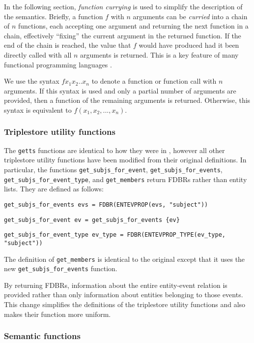 \documentclass[../main.tex]{subfiles}
\begin{document}
In the following section, {\em function currying} \cite{currying} is used to simplify the description of the semantics.
Briefly, a function $f$ with $n$ arguments can be {\em curried} into a chain of $n$ functions, each accepting one argument and returning the next function
in a chain, effectively ``fixing'' the current argument in the returned function.  If the end of the chain is reached, the value that $f$
would have produced had it been directly called with all $n$ arguments is returned.  This is a key feature of many functional programming languages \cite{haskell}.

We use the syntax $f x_1 x_2 .. x_n$ to denote a function or function call with $n$ arguments.  If this syntax is used
and only a partial number of arguments are provided, then a function of the remaining arguments is returned.  Otherwise,
this syntax is equivalent to $f(x_1, x_2, ..., x_n)$.

\subsubsection{Triplestore utility functions}

The \texttt{getts} functions are identical to how they were in \cite{frost2013event}, however
all other triplestore utility functions have been modified from their original definitions.
In particular, the functions \texttt{get\_subjs\_for\_event}, \texttt{get\_subjs\_for\_events},
\texttt{get\_subjs\_for\_event\_type}, and \texttt{get\_members} return FDBRs rather than entity lists.  They are defined as follows:

\texttt{get\_subjs\_for\_events evs = FDBR(ENTEVPROP(evs, "subject"))}

\texttt{get\_subjs\_for\_event ev = get\_subjs\_for\_events \{ev\}}

\texttt{get\_subjs\_for\_event\_type ev\_type = FDBR(ENTEVPROP\_TYPE(ev\_type, "subject"))}

The definition of \texttt{get\_members} is identical to the original except that it uses the new \texttt{get\_subjs\_for\_events} function.

By returning FDBRs, information about the entire entity-event relation is provided rather than only information about entities
belonging to those events.  This change simplifies the definitions of the triplestore utility functions and also makes their function
more uniform.


\subsubsection{Semantic functions}
\end{document}
